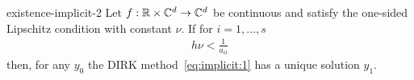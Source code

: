 \begin{Lemma}{existence-implicit-2}
  Let $f:\mathbb R\times\mathbb C^d\to\mathbb C^d$ be continuous and satisfy the one-sided Lipschitz
  condition with constant $\nu$. If for $i=1,\dots,s$
  \begin{gather}
    \label{eq:existence-implicit-2:1}
    h\nu < \frac1{a_{ii}}
  \end{gather}
  then, for any $y_0$ the DIRK method~\eqref{eq:implicit:1} has a unique
  solution $y_1$.
\end{Lemma}

